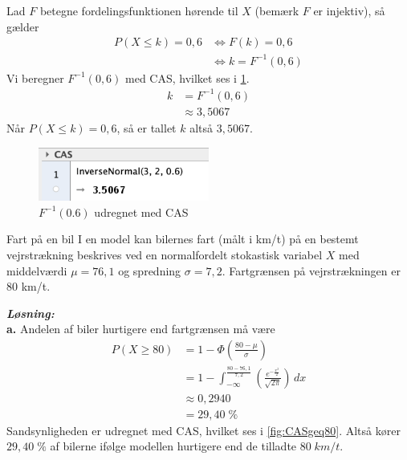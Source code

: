 \documentclass{article}
\newcommand{\sol}{\setlength{\parindent}{0cm}\textbf{\textit{Løsning:}}\setlength{\parindent}{1cm}}
\begin{document}
Lad $F$ betegne fordelingsfunktionen hørende til $X$ (bemærk $F$ er injektiv), så gælder
\begin{equation*}
\begin{split}
  P(X \leq k)=0,6 &\iff F(k)=0,6 \\
  &\iff k=F ^{-1}(0,6)
\end{split}
\end{equation*}
Vi beregner $F ^{-1}(0,6)$ med CAS, hvilket ses i \cref{fig:fraktilfunk}. 
\begin{equation*}
\begin{split}
  k&=F ^{-1}(0,6)\\
  &\approx 3,5067
\end{split}
\end{equation*}
Når $P(X \leq k)=0,6$, så er tallet $k$ altså $3,5067$.
\begin{figure}[H]
\begin{center}
  \includegraphics[width=0.5\textwidth]{fraktilfunk.png}
\end{center}
  \caption{$F ^{-1} (0.6)$ udregnet med CAS }
\label{fig:fraktilfunk}
\end{figure}
\begin{question}{Fart på en bil}{}
  I en model kan bilernes fart (målt i km/t) på en bestemt vejrstrækning beskrives ved en normalfordelt stokastisk variabel $X$ med middelværdi $\mu = 76,1$ og spredning $\sigma = 7,2$. 
  Fartgrænsen på vejrstrækningen er 80 km/t.
\end{question}
\sol \\
\textbf{a.}
Andelen af biler hurtigere end fartgrænsen må være
\begin{equation*}
\begin{split}
  P(X \geq 80)&= 1 - \Phi \left(\frac{80 - \mu }{\sigma }\right) \\
  &=1-\int_{- \infty }^{\frac{80-76,1}{7,2}}\left(  \frac{e^{-\frac{x^2}{2}} }{\sqrt{2 \pi } }\right) \,dx \\
  &\approx 0,2940\\
  &=29,40 \;\%
\end{split}
\end{equation*}
Sandsynligheden er udregnet med CAS, hvilket ses i \cref{fig:CASgeq80}.
Altså kører $29,40 \;\%$ af bilerne ifølge modellen hurtigere end de tilladte $80 \;\unit{km/t} $. 
\end{document}
